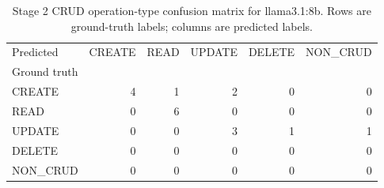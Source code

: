 \begin{table}[htbp]
\caption{Stage 2 CRUD operation-type confusion matrix for llama3.1:8b. Rows are ground-truth labels; columns are predicted labels.}
\label{tab:stage2_confusion_llama3_1_8b}
\begin{tabular}{lrrrrr}
\toprule
Predicted & CREATE & READ & UPDATE & DELETE & NON_CRUD \\
Ground truth &  &  &  &  &  \\
\midrule
CREATE & 4 & 1 & 2 & 0 & 0 \\
READ & 0 & 6 & 0 & 0 & 0 \\
UPDATE & 0 & 0 & 3 & 1 & 1 \\
DELETE & 0 & 0 & 0 & 0 & 0 \\
NON_CRUD & 0 & 0 & 0 & 0 & 0 \\
\bottomrule
\end{tabular}
\end{table}
